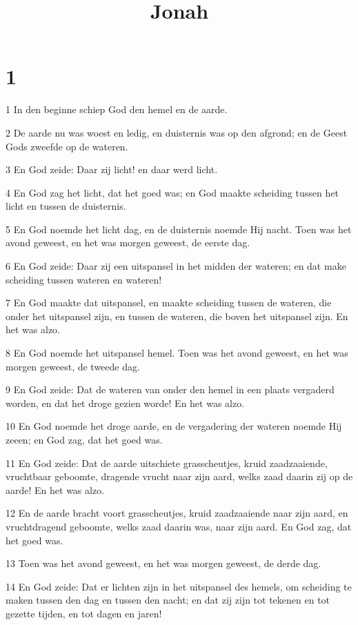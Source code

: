 

\title{Jonah}



\chapter{1}

\par 1 In den beginne schiep God den hemel en de aarde.
\par 2 De aarde nu was woest en ledig, en duisternis was op den afgrond; en de Geest Gods zweefde op de wateren.
\par 3 En God zeide: Daar zij licht! en daar werd licht.
\par 4 En God zag het licht, dat het goed was; en God maakte scheiding tussen het licht en tussen de duisternis.
\par 5 En God noemde het licht dag, en de duisternis noemde Hij nacht. Toen was het avond geweest, en het was morgen geweest, de eerste dag.
\par 6 En God zeide: Daar zij een uitspansel in het midden der wateren; en dat make scheiding tussen wateren en wateren!
\par 7 En God maakte dat uitspansel, en maakte scheiding tussen de wateren, die onder het uitspansel zijn, en tussen de wateren, die boven het uitspansel zijn. En het was alzo.
\par 8 En God noemde het uitspansel hemel. Toen was het avond geweest, en het was morgen geweest, de tweede dag.
\par 9 En God zeide: Dat de wateren van onder den hemel in een plaats vergaderd worden, en dat het droge gezien worde! En het was alzo.
\par 10 En God noemde het droge aarde, en de vergadering der wateren noemde Hij zeeen; en God zag, dat het goed was.
\par 11 En God zeide: Dat de aarde uitschiete grasscheutjes, kruid zaadzaaiende, vruchtbaar geboomte, dragende vrucht naar zijn aard, welks zaad daarin zij op de aarde! En het was alzo.
\par 12 En de aarde bracht voort grasscheutjes, kruid zaadzaaiende naar zijn aard, en vruchtdragend geboomte, welks zaad daarin was, naar zijn aard. En God zag, dat het goed was.
\par 13 Toen was het avond geweest, en het was morgen geweest, de derde dag.
\par 14 En God zeide: Dat er lichten zijn in het uitspansel des hemels, om scheiding te maken tussen den dag en tussen den nacht; en dat zij zijn tot tekenen en tot gezette tijden, en tot dagen en jaren!
